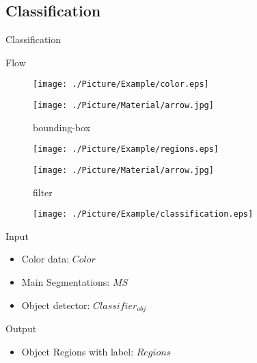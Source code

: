 \documentclass[xcolor=table,compress,blue]{beamer}
\begin{document}
\subsection{Classification}
\begin{frame}{Classification}
	\begin{exampleblock}{Flow}
		\begin{figure}[htpb]
			\centering
			\begin{minipage}[b]{0.8in}
				\centerline{ \texttt{[image: ./Picture/Example/color.eps]} }
			\end{minipage}
			\begin{minipage}[b]{0.8in}
				\centerline{ \texttt{[image: ./Picture/Material/arrow.jpg]} }
				\centerline{\tiny{bounding-box}}
			\end{minipage}
			\begin{minipage}[b]{0.8in}
				\centerline{ \texttt{[image: ./Picture/Example/regions.eps]} }
			\end{minipage}
			\begin{minipage}[b]{0.8in}
				\centerline{ \texttt{[image: ./Picture/Material/arrow.jpg]} }
				\centerline{\tiny{filter}}
			\end{minipage}
			\begin{minipage}[b]{0.8in}
				\centerline{ \texttt{[image: ./Picture/Example/classification.eps]} }
			\end{minipage}
		\end{figure}
	\end{exampleblock}
	\begin{exampleblock}{Input}
		\begin{itemize}		
			\item Color data: $Color$	
			\item Main Segmentations: $MS$ 
			\item Object detector: ${Classifier}_{obj}$
		\end{itemize}
	\end{exampleblock}
	\begin{exampleblock}{Output}
		\begin{itemize}
			\item Object Regions with label: $Regions$
		\end{itemize}
	\end{exampleblock}
\end{frame}
\end{document}
